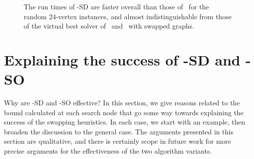 \begin{figure}[h!]
    \centering
    \caption{The run times of \McSplit-SD are faster overall than those of \McSplit\ for the
        random 24-vertex instances, and almost indistinguishable from those of the virtual
        best solver of \McSplit\ and \McSplit\ with swapped graphs.}
        \label{figure:left-vs-smart-o-mcis}
\end{figure}

\section{Explaining the success of \McSplit-SD and \McSplit-SO}\label{sec:explaining-sd-so}

Why are \McSplit-SD and \McSplit-SO effective?  In this section, we give reasons related
to the bound calculated at each search node that go some way towards explaining
the success of the swapping heuristics.  In each case, we start with an example,
then broaden the discussion to the general case.  The arguments presented in this
section are qualitative, and there is certainly scope in future work for more precise
arguments for the effectiveness of the two algorithm variants.

